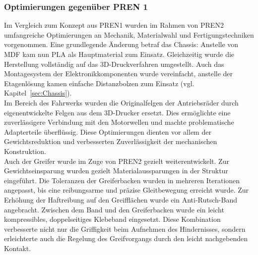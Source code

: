 \documentclass[main.tex]{subfiles} %
\begin{document}

\subsubsection{Optimierungen gegenüber PREN 1}

Im Vergleich zum Konzept aus PREN1 wurden im Rahmen von PREN2 umfangreiche Optimierungen an Mechanik, 
Materialwahl und Fertigungstechniken vorgenommen.
Eine grundlegende Änderung betraf das Chassis: Anstelle von MDF kam nun PLA als Hauptmaterial zum Einsatz. 
Gleichzeitig wurde die Herstellung vollständig auf das 3D-Druckverfahren umgestellt.
Auch das Montagesystem der Elektronikkomponenten wurde vereinfacht, anstelle der Etagenlösung 
kamen einfache Distanzbolzen zum Einsatz (vgl. Kapitel~\ref{sec:Chassis}). \\

Im Bereich des Fahrwerks wurden die Originalfelgen der Antriebsräder durch eigenentwickelte 
Felgen aus dem 3D-Drucker ersetzt. Dies ermöglichte eine zuverlässigere Verbindung mit den Motorwellen und 
machte problematische Adapterteile überflüssig. Diese Optimierungen dienten vor allem der Gewichtsreduktion und 
verbesserten Zuverlässigkeit der mechanischen Konstruktion.\\

Auch der Greifer wurde im Zuge von PREN2 gezielt weiterentwickelt. Zur Gewichtseinsparung wurden 
gezielt Materialaussparungen in der Struktur eingeführt. Die Toleranzen der Greiferbacken wurden 
in mehreren Iterationen angepasst, bis eine reibungsarme und präzise Gleitbewegung erreicht wurde.
Zur Erhöhung der Haftreibung auf den Greifflächen wurde ein Anti-Rutsch-Band angebracht. 
Zwischen dem Band und den Greiferbacken wurde ein leicht kompressibles, doppelseitiges Klebeband eingesetzt. 
Diese Kombination verbesserte nicht nur die Griffigkeit beim Aufnehmen des Hindernisses, sondern 
erleichterte auch die Regelung des Greifvorgangs durch den leicht nachgebenden Kontakt.
\end{document}
